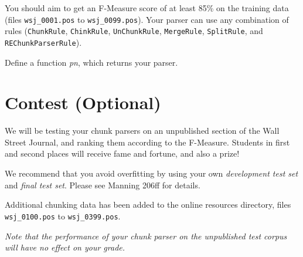 \documentclass{cis530}
\begin{document}
  You should aim to get an F-Measure score of at least
  85\% on the training data (files 
  \texttt{wsj\_0001.pos} to \texttt{wsj\_0099.pos}).
  Your parser can use any
  combination of rules (\texttt{ChunkRule}, \texttt{ChinkRule},
  \texttt{UnChunkRule}, \texttt{MergeRule}, \texttt{SplitRule}, and
  \texttt{REChunkParserRule}).

  Define a function \textit{pn}, which returns your parser.

\section{Contest (Optional)}

  We will be testing your chunk parsers on an unpublished section of
  the Wall Street Journal, and ranking them according to the
  F-Measure.  Students in first and second places will receive fame
  and fortune, and also a prize!

  We recommend that you avoid overfitting by using your own
  \emph{development test set} and \emph{final test set}.
  Please see Manning 206ff for details.

  Additional chunking data has been added to the online resources
  directory, files \texttt{wsj\_0100.pos} to \texttt{wsj\_0399.pos}.

  \emph{Note that the performance of your chunk parser on the unpublished
  test corpus will have no effect on your grade.}
\end{document}
